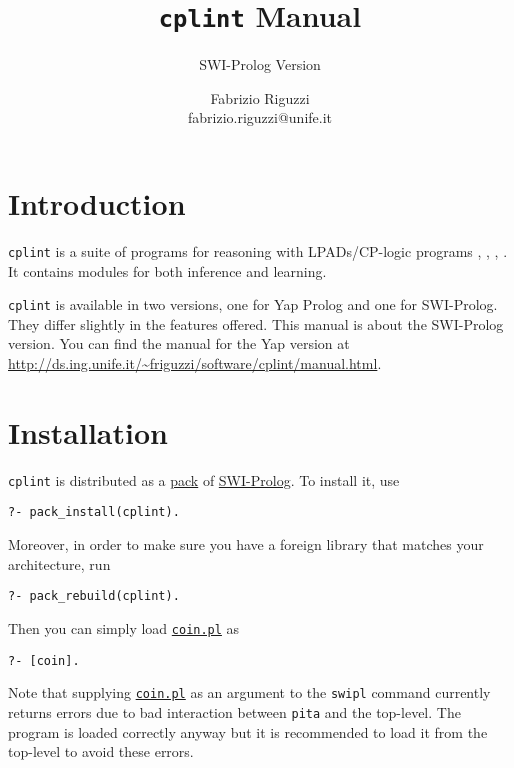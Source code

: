 \documentclass[a4paper,10pt]{scrartcl}
\begin{document}
\title{\texttt{cplint} Manual}

\subtitle{SWI-Prolog Version}

\author{Fabrizio Riguzzi\\
fabrizio.riguzzi@unife.it}

\maketitle


\section{Introduction}


\texttt{cplint} is a suite of programs for reasoning with LPADs/CP-logic programs  \cite{VenVer03-TR}, \cite{VenVer04-ICLP04-IC},
\cite{VenDenBru-JELIA06},
\cite{DBLP:journals/tplp/VennekensDB09}. It contains modules for both inference and learning.

\texttt{cplint} is available in two versions, one for Yap Prolog and one for SWI-Prolog. They differ slightly in the features offered.
This manual is about the SWI-Prolog version. You can find the manual for the Yap version at \url{http://ds.ing.unife.it/~friguzzi/software/cplint/manual.html}.

\section{Installation}
\texttt{cplint} is distributed as a \href{http://www.swi-prolog.org/pack/list?p=cplint}{pack} of \href{http://www.swi-prolog.org/}{SWI-Prolog}. To install it, use
\begin{verbatim}
?- pack_install(cplint).
\end{verbatim}
Moreover, in order to make sure you have a foreign library that matches your architecture, run
\begin{verbatim}
?- pack_rebuild(cplint). 
\end{verbatim}







Then you can simply load \href{http://cplint.lamping.unife.it/example/inference/coin.pl}{\texttt{coin.pl}} as
\begin{verbatim}
?- [coin].
\end{verbatim}
Note that supplying \href{http://cplint.lamping.unife.it/example/inference/coin.pl}{\texttt{coin.pl}} as an argument to the \verb|swipl| command currently returns errors due to bad interaction between \verb|pita| and the top-level.
The program is loaded correctly anyway but it is recommended to load it from the top-level to avoid these errors.
\end{document}
